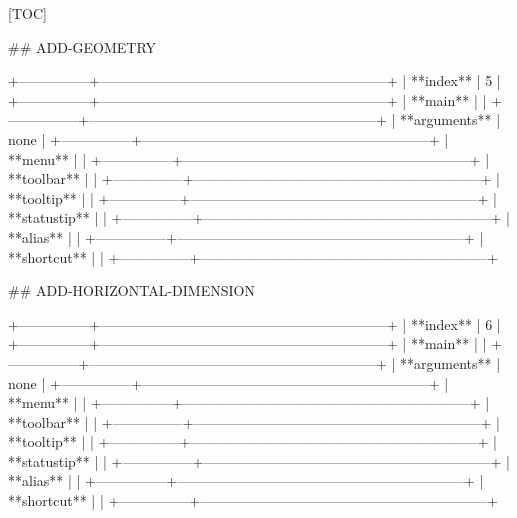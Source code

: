 [TOC]

## ADD-GEOMETRY

+---------------+--------------------------------------------------------------+
| **index**     | 5                                                            |
+---------------+--------------------------------------------------------------+
| **main**      |                                                              |
+---------------+--------------------------------------------------------------+
| **arguments** | none                                                         |
+---------------+--------------------------------------------------------------+
| **menu**      |                                                              |
+---------------+--------------------------------------------------------------+
| **toolbar**   |                                                              |
+---------------+--------------------------------------------------------------+
| **tooltip**   |                                                              |
+---------------+--------------------------------------------------------------+
| **statustip** |                                                              |
+---------------+--------------------------------------------------------------+
| **alias**     |                                                              |
+---------------+--------------------------------------------------------------+
| **shortcut**  |                                                              |
+---------------+--------------------------------------------------------------+

## ADD-HORIZONTAL-DIMENSION

+---------------+--------------------------------------------------------------+
| **index**     | 6                                                            |
+---------------+--------------------------------------------------------------+
| **main**      |                                                              |
+---------------+--------------------------------------------------------------+
| **arguments** | none                                                         |
+---------------+--------------------------------------------------------------+
| **menu**      |                                                              |
+---------------+--------------------------------------------------------------+
| **toolbar**   |                                                              |
+---------------+--------------------------------------------------------------+
| **tooltip**   |                                                              |
+---------------+--------------------------------------------------------------+
| **statustip** |                                                              |
+---------------+--------------------------------------------------------------+
| **alias**     |                                                              |
+---------------+--------------------------------------------------------------+
| **shortcut**  |                                                              |
+---------------+--------------------------------------------------------------+


